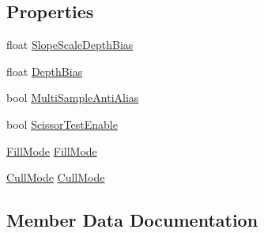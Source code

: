 \subsection*{Properties}
\begin{DoxyCompactItemize}
\item 
float \hyperlink{class_microsoft_1_1_xna_1_1_framework_1_1_graphics_1_1_rasterizer_state_a28262155003d4367c518a3c7043bd423}{Slope\+Scale\+Depth\+Bias}
\item 
float \hyperlink{class_microsoft_1_1_xna_1_1_framework_1_1_graphics_1_1_rasterizer_state_aecb8ca4bb0d12beb0caf1726ba9bf7dd}{Depth\+Bias}
\item 
bool \hyperlink{class_microsoft_1_1_xna_1_1_framework_1_1_graphics_1_1_rasterizer_state_aa2f92aabaf4e4a59c04e7e069d2c3248}{Multi\+Sample\+Anti\+Alias}
\item 
bool \hyperlink{class_microsoft_1_1_xna_1_1_framework_1_1_graphics_1_1_rasterizer_state_ae6cd917a3858ce0cb8ce802ed59b6373}{Scissor\+Test\+Enable}
\item 
\hyperlink{namespace_microsoft_1_1_xna_1_1_framework_1_1_graphics_a606c767daf0552695e5435f35072059e}{Fill\+Mode} \hyperlink{class_microsoft_1_1_xna_1_1_framework_1_1_graphics_1_1_rasterizer_state_a227c3eda4a0856d055ba010181fadfab}{Fill\+Mode}
\item 
\hyperlink{namespace_microsoft_1_1_xna_1_1_framework_1_1_graphics_afb7395271e8f259dac0e29db861d7c9b}{Cull\+Mode} \hyperlink{class_microsoft_1_1_xna_1_1_framework_1_1_graphics_1_1_rasterizer_state_aa150a2bafe9ec048f8002739a853863b}{Cull\+Mode}
\end{DoxyCompactItemize}


\subsection{Member Data Documentation}
\hypertarget{class_microsoft_1_1_xna_1_1_framework_1_1_graphics_1_1_rasterizer_state_aaaa680de38a8d4c73da5c31630e1b6cb}{}

